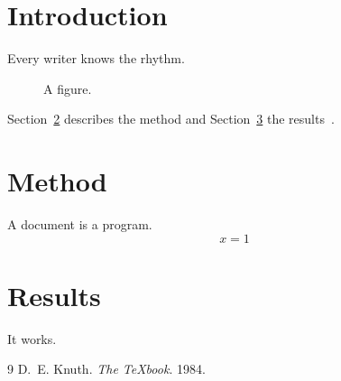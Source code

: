 \documentclass[11pt]{article}
\begin{document}
\section{Introduction}\label{sec:intro}
Every writer knows the rhythm.

\begin{figure}[h!]
\centering
\newcommand\petals{5}
\caption{A figure.}\label{fig:live}
\end{figure}

Section~\ref{sec:method} describes the method and Section~\ref{sec:results} the results~\cite{knuth84}.

\newpage
\section{Method}\label{sec:method}
A document is a program.
\[ x = 1 \]

\newpage
\section{Results}\label{sec:results}
It works.

\begin{thebibliography}{9}
 D.~E. Knuth. \emph{The \TeX book}. 1984.
\end{thebibliography}
\end{document}
